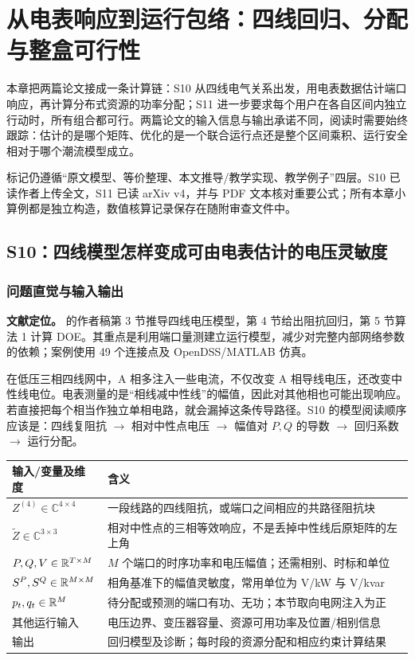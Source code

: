 \chapter{从电表响应到运行包络：四线回归、分配与整盒可行性}
\label{ch:operating_envelopes}

本章把两篇论文接成一条计算链：S10 从四线电气关系出发，用电表数据估计端口响应，再计算分布式资源的功率分配；S11 进一步要求每个用户在各自区间内独立行动时，所有组合都可行。两篇论文的输入信息与输出承诺不同，阅读时需要始终跟踪：估计的是哪个矩阵、优化的是一个联合运行点还是整个区间乘积、运行安全相对于哪个潮流模型成立。

标记仍遵循“原文模型、等价整理、本文推导/教学实现、教学例子”四层。S10 已读作者上传全文，S11 已读 arXiv v4，并与 PDF 文本核对重要公式；所有本章小算例都是独立构造，数值核算记录保存在随附审查文件中。

\section{S10：四线模型怎样变成可由电表估计的电压灵敏度}
\label{sec:oe_s10}

\subsection{问题直觉与输入输出}

\textbf{文献定位。}\citet{S10} 的作者稿第 3 节推导四线电压模型，第 4 节给出阻抗回归，第 5 节算法 1 计算 DOE。其重点是利用端口量测建立运行模型，减少对完整内部网络参数的依赖；案例使用 49 个连接点及 OpenDSS/MATLAB 仿真。

在低压三相四线网中，A 相多注入一些电流，不仅改变 A 相导线电压，还改变中性线电位。电表测量的是“相线减中性线”的幅值，因此对其他相也可能出现响应。若直接把每个相当作独立单相电路，就会漏掉这条传导路径。S10 的模型阅读顺序应该是：四线复阻抗 $\to$ 相对中性点电压 $\to$ 幅值对 $P,Q$ 的导数 $\to$ 回归系数 $\to$ 运行分配。

\begin{center}
\begin{tabularx}{\textwidth}{@{}lX@{}}
\toprule
输入/变量及维度 & 含义 \\
\midrule
$Z^{(4)}\in\mathbb C^{4\times4}$ & 一段线路的四线阻抗，或端口之间相应的共路径阻抗块 \\
$\widetilde Z\in\mathbb C^{3\times3}$ & 相对中性点的三相等效响应，不是丢掉中性线后原矩阵的左上角 \\
$P,Q,V\in\mathbb{R}^{T\times M}$ & $M$ 个端口的时序功率和电压幅值；还需相别、时标和单位 \\
$S^P,S^Q\in\mathbb{R}^{M\times M}$ & 相角基准下的幅值灵敏度，常用单位为 V/kW 与 V/kvar \\
$p_t,q_t\in\mathbb{R}^M$ & 待分配或预测的端口有功、无功；本节取向电网注入为正 \\
其他运行输入 & 电压边界、变压器容量、资源可用功率及位置/相别信息 \\
输出 & 回归模型及诊断；每时段的资源分配和相应约束计算结果 \\
\bottomrule
\end{tabularx}
\end{center}

